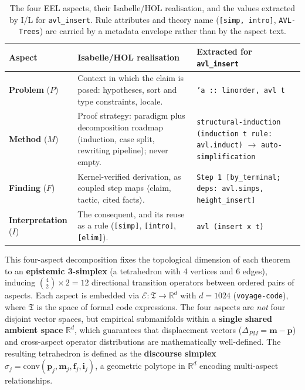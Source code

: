 \documentclass{svproc}
\begin{document}
\begin{table}[t]
\caption{The four EEL aspects, their Isabelle/HOL realisation, and the values extracted by I/L for \texttt{avl\_insert}. Rule attributes and theory name (\texttt{[simp, intro]}, \texttt{AVL-Trees}) are carried by a metadata envelope rather than by the aspect text.}\label{tab:aspects}
\centering\small
\renewcommand{\arraystretch}{1.1}
\begin{tabular}{@{}>{\raggedright\arraybackslash}p{2.45cm}>{\raggedright\arraybackslash}p{3.9cm}>{\raggedright\arraybackslash}p{4.8cm}@{}}
\hline
\textbf{Aspect} & \textbf{Isabelle/HOL realisation} & \textbf{Extracted for \texttt{avl\_insert}}\\
\hline
\textbf{Problem} ($P$) & Context in which the claim is posed: hypotheses, sort and type constraints, locale. & \texttt{'a :: linorder, avl t}\\
\textbf{Method} ($M$) & Proof strategy: paradigm plus decomposition roadmap (induction, case split, rewriting pipeline); never empty. & \texttt{structural-induction (induction t rule: avl.induct)} $\to$ \texttt{auto-simplification}\\
\textbf{Finding} ($F$) & Kernel-verified derivation, as coupled step maps $\langle$claim, tactic, cited facts$\rangle$. & \texttt{Step 1 [by\_terminal; deps: avl.simps, height\_insert]}\\
\textbf{Interpretation} ($I$) & The consequent, and its reuse as a rule (\texttt{[simp]}, \texttt{[intro]}, \texttt{[elim]}). & \texttt{avl (insert x t)}\\
\hline
\end{tabular}
\end{table}
This four-aspect decomposition fixes the topological dimension of each theorem to an \textbf{epistemic 3-simplex} (a tetrahedron with 4 vertices and 6 edges), inducing $\binom{4}{2} \times 2 = 12$ directional transition operators between ordered pairs of aspects. Each aspect is embedded via $\mathcal{E} : \mathfrak{T} \to \mathbb{R}^d$ with $d = 1024$ (\texttt{voyage\allowbreak-code}), where $\mathfrak{T}$ is the space of formal code expressions. The four aspects are \emph{not} four disjoint vector spaces, but empirical submanifolds within a \textbf{single shared ambient space} $\mathbb{R}^d$, which guarantees that displacement vectors ($\Delta_{PM} = \mathbf{m} - \mathbf{p}$) and cross-aspect operator distributions are mathematically well-defined. The resulting tetrahedron is defined as the \textbf{discourse simplex} $\sigma_j = \text{conv}(\mathbf{p}_j, \mathbf{m}_j, \mathbf{f}_j, \mathbf{i}_j)$, a geometric polytope in $\mathbb{R}^d$ encoding multi-aspect relationships.
\end{document}
